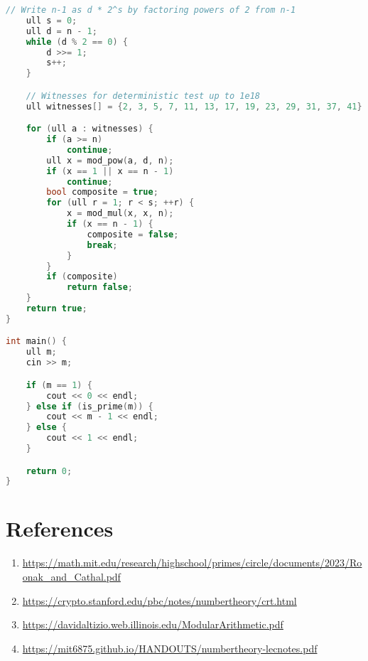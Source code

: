 \documentclass[10pt,a4paper]{article}
\begin{document}
\begin{itemize}
\begin{lstlisting}[language=C++, caption={Product of coprimes}, label={1st:code}, mathescape=true, breaklines=true]
    // Write n-1 as d * 2^s by factoring powers of 2 from n-1
    ull s = 0;
    ull d = n - 1;
    while (d % 2 == 0) {
        d >>= 1;
        s++;
    }

    // Witnesses for deterministic test up to 1e18
    ull witnesses[] = {2, 3, 5, 7, 11, 13, 17, 19, 23, 29, 31, 37, 41};

    for (ull a : witnesses) {
        if (a >= n)
            continue;
        ull x = mod_pow(a, d, n);
        if (x == 1 || x == n - 1)
            continue;
        bool composite = true;
        for (ull r = 1; r < s; ++r) {
            x = mod_mul(x, x, n);
            if (x == n - 1) {
                composite = false;
                break;
            }
        }
        if (composite)
            return false;
    }
    return true;
}

int main() {
    ull m;
    cin >> m;

    if (m == 1) {
        cout << 0 << endl;
    } else if (is_prime(m)) {
        cout << m - 1 << endl;
    } else {
        cout << 1 << endl;
    }

    return 0;
}

\end{lstlisting}


\newpage


\section*{References}

\begin{enumerate}

   \item \href{https://math.mit.edu/research/highschool/primes/circle/documents/2023/Roonak_and_Cathal.pdf}{https://math.mit.edu/research/highschool/primes/circle/documents/2023/Roonak_and_Cathal.pdf}
   
    \item \href{https://crypto.stanford.edu/pbc/notes/numbertheory/crt.html}{https://crypto.stanford.edu/pbc/notes/numbertheory/crt.html}

    \item \href{https://davidaltizio.web.illinois.edu/ModularArithmetic.pdf}{https://davidaltizio.web.illinois.edu/ModularArithmetic.pdf}
    
    \item \href{https://mit6875.github.io/HANDOUTS/numbertheory-lecnotes.pdf}{https://mit6875.github.io/HANDOUTS/numbertheory-lecnotes.pdf}
    

\end{enumerate}
\end{itemize}
\end{document}
